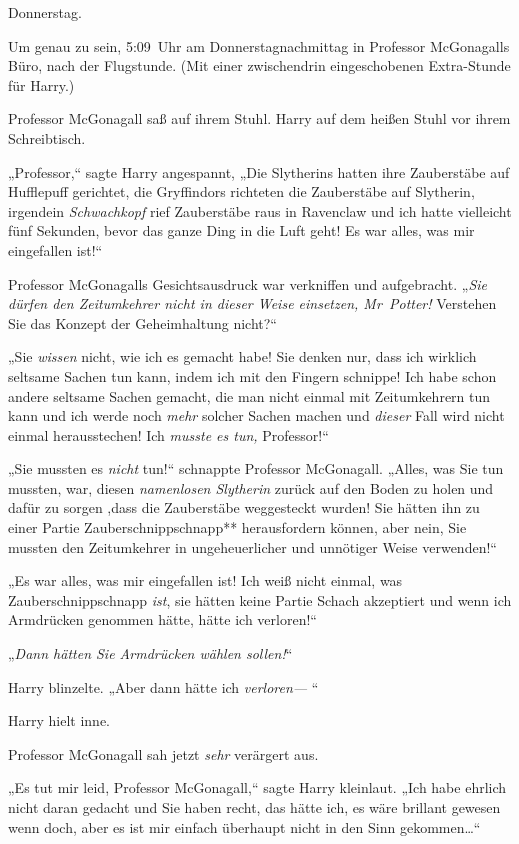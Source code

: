 {\later

Donnerstag.

Um genau zu sein, 5:09~Uhr am Donnerstagnachmittag in Professor McGonagalls Büro, nach der Flugstunde. (Mit einer zwischendrin eingeschobenen Extra-Stunde für Harry.)

Professor McGonagall saß auf ihrem Stuhl. Harry auf dem heißen Stuhl vor ihrem Schreibtisch.

„Professor,“ sagte Harry angespannt, „Die Slytherins hatten ihre Zauberstäbe auf Hufflepuff gerichtet, die Gryffindors richteten die Zauberstäbe auf Slytherin, irgendein \emph{Schwachkopf} rief Zauberstäbe raus in Ravenclaw und ich hatte vielleicht fünf Sekunden, bevor das ganze Ding in die Luft geht! Es war alles, was mir eingefallen ist!“

Professor McGonagalls Gesichtsausdruck war verkniffen und aufgebracht. „\emph{Sie dürfen den Zeitumkehrer nicht in dieser Weise einsetzen, Mr~Potter!} Verstehen Sie das Konzept der Geheimhaltung nicht?“

„Sie \emph{wissen} nicht, wie ich es gemacht habe! Sie denken nur, dass ich wirklich seltsame Sachen tun kann, indem ich mit den Fingern schnippe! Ich habe schon andere seltsame Sachen gemacht, die man nicht einmal mit Zeitumkehrern tun kann und ich werde noch \emph{mehr} solcher Sachen machen und \emph{dieser} Fall wird nicht einmal herausstechen! Ich \emph{musste es tun,} Professor!“

„Sie mussten es \emph{nicht} tun!“ schnappte Professor McGonagall. „Alles, was Sie tun mussten, war, diesen \emph{namenlosen Slytherin} zurück auf den Boden zu holen und dafür zu sorgen ,dass die Zauberstäbe weggesteckt wurden! Sie hätten ihn zu einer Partie Zauberschnippschnapp** herausfordern können, aber nein, Sie mussten den Zeitumkehrer in ungeheuerlicher und unnötiger Weise verwenden!“

„Es war alles, was mir eingefallen ist! Ich weiß nicht einmal, was Zauberschnippschnapp \emph{ist}, sie hätten keine Partie Schach akzeptiert und wenn ich Armdrücken genommen hätte, hätte ich verloren!“

„\emph{Dann hätten Sie Armdrücken wählen sollen!}“

Harry blinzelte. „Aber dann hätte ich \emph{verloren—} “

Harry hielt inne.

Professor McGonagall sah jetzt \emph{sehr} verärgert aus.

„Es tut mir leid, Professor McGonagall,“ sagte Harry kleinlaut. „Ich habe ehrlich nicht daran gedacht und Sie haben recht, das hätte ich, es wäre brillant gewesen wenn doch, aber es ist mir einfach überhaupt nicht in den Sinn gekommen…“

}
